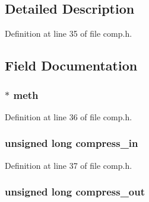 \subsection{Detailed Description}


Definition at line 35 of file comp.\+h.



\subsection{Field Documentation}
\subsubsection[{\texorpdfstring{meth}{meth}}]{ $\ast$ meth}\hypertarget{structcomp__ctx__st_a472fdf81e6f3f58725ff5edc9f29c87e}{}\label{structcomp__ctx__st_a472fdf81e6f3f58725ff5edc9f29c87e}


Definition at line 36 of file comp.\+h.

\subsubsection[{\texorpdfstring{compress\+\_\+in}{compress_in}}]{\setlength{\rightskip}{0pt plus 5cm}unsigned long compress\+\_\+in}\hypertarget{structcomp__ctx__st_a7510b41bc217b99eafcabb1eed892cb9}{}\label{structcomp__ctx__st_a7510b41bc217b99eafcabb1eed892cb9}


Definition at line 37 of file comp.\+h.

\subsubsection[{\texorpdfstring{compress\+\_\+out}{compress_out}}]{\setlength{\rightskip}{0pt plus 5cm}unsigned long compress\+\_\+out}\hypertarget{structcomp__ctx__st_a6e77ea6b7bbc41269009e13610c89d4a}{}\label{structcomp__ctx__st_a6e77ea6b7bbc41269009e13610c89d4a}


